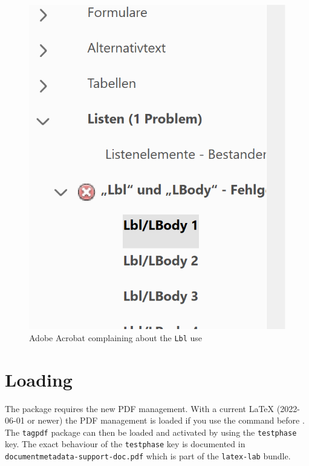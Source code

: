 \documentclass[DIV=12,parskip=half-,bibliography=totoc,a4paper]{article}
\begin{document}
\begin{figure}
\tagpdfparaOff

%
\tagmcbegin{}%
\includegraphics{acrobat}
\tagmcend

\tagmcbegin{}\caption{Adobe Acrobat complaining
about the \texttt{Lbl} use}\label{fig:adobe} \tagmcend\tagstructend 
\tagstructend

\tagpdfparaOn
\end{figure}


\section{Loading}

The package requires the new PDF management. With a current \LaTeX{} (2022-06-01 or newer)
the PDF management is loaded if you use the  command before .
The \texttt{tagpdf} package can then be loaded and activated by using the \texttt{testphase} key. The exact behaviour of
the \texttt{testphase} key is documented in \texttt{documentmetadata-support-doc.pdf} which
is part of the \texttt{latex-lab} bundle.
\end{document}
